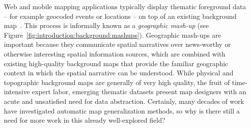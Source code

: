 \documentclass[11pt, oneside]{report}
\begin{document}
{Web and mobile mapping applications typically display thematic foreground data -- for example geocoded events or locations -- on top of an existing background map~\cite{bereuter2012algorithms}. This process is informally known as a \emph{geographic mash-up} (see Figure~\ref{fig:introduction:background:mashups}}). %
Geographic mash-ups are important because they communicate spatial narratives over news-worthy or otherwise interesting spatial information sources, which are combined with existing high-quality background maps that provide the familiar geographic context in which the spatial narrative can be understood. %
While physical and topographic background maps are generally of very high quality, the fruit of time-intensive expert labor, emerging thematic datasets present map designers with an acute and unsatisfied need for data abstraction.  %
Certainly, many decades of work have investigated automatic map generalization methods, so why is there still a need for more work in this already well-explored field? 
\end{document}
